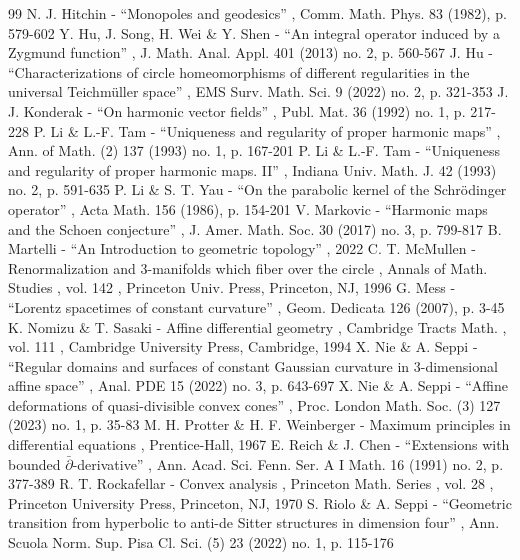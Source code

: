 \documentclass[10pt]{amsart}
\theoremstyle{plain}
\theoremstyle{definition}
\begin{document}
\begin{thebibliography}{99}
 N. J. Hitchin - “Monopoles and geodesics” , Comm. Math. Phys. 83 (1982), p. 579-602
 Y. Hu, J. Song, H. Wei \& Y. Shen - “An integral operator induced by a Zygmund function” , J. Math. Anal. Appl. 401 (2013) no. 2, p. 560-567
 J. Hu - “Characterizations of circle homeomorphisms of different regularities in the universal Teichmüller space” , EMS Surv. Math. Sci. 9 (2022) no. 2, p. 321-353
 J. J. Konderak - “On harmonic vector fields” , Publ. Mat. 36 (1992) no. 1, p. 217-228
 P. Li \& L.-F. Tam - “Uniqueness and regularity of proper harmonic maps” , Ann. of Math. (2) 137 (1993) no. 1, p. 167-201
 P. Li \& L.-F. Tam - “Uniqueness and regularity of proper harmonic maps. II” , Indiana Univ. Math. J. 42 (1993) no. 2, p. 591-635
 P. Li \& S. T. Yau - “On the parabolic kernel of the Schrödinger operator” , Acta Math. 156 (1986), p. 154-201
 V. Markovic - “Harmonic maps and the Schoen conjecture” , J. Amer. Math. Soc. 30 (2017) no. 3, p. 799-817
 B. Martelli - “An Introduction to geometric topology” , 2022
 C. T. McMullen - Renormalization and $3$-manifolds which fiber over the circle , Annals of Math. Studies , vol. 142 , Princeton Univ. Press, Princeton, NJ, 1996
 G. Mess - “Lorentz spacetimes of constant curvature” , Geom. Dedicata 126 (2007), p. 3-45
 K. Nomizu \& T. Sasaki - Affine differential geometry , Cambridge Tracts Math. , vol. 111 , Cambridge University Press, Cambridge, 1994
 X. Nie \& A. Seppi - “Regular domains and surfaces of constant Gaussian curvature in $3$-dimensional affine space” , Anal. PDE 15 (2022) no. 3, p. 643-697
 X. Nie \& A. Seppi - “Affine deformations of quasi-divisible convex cones” , Proc. London Math. Soc. (3) 127 (2023) no. 1, p. 35-83
 M. H. Protter \& H. F. Weinberger - Maximum principles in differential equations , Prentice-Hall, 1967
 E. Reich \& J. Chen - “Extensions with bounded $\bar{\partial }$-derivative” , Ann. Acad. Sci. Fenn. Ser. A I Math. 16 (1991) no. 2, p. 377-389
 R. T. Rockafellar - Convex analysis , Princeton Math. Series , vol. 28 , Princeton University Press, Princeton, NJ, 1970
 S. Riolo \& A. Seppi - “Geometric transition from hyperbolic to anti-de Sitter structures in dimension four” , Ann. Scuola Norm. Sup. Pisa Cl. Sci. (5) 23 (2022) no. 1, p. 115-176

\end{thebibliography}
\end{document}
